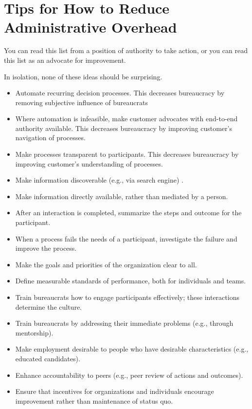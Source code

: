 \section{Tips for How to Reduce Administrative Overhead}

You can read this list from a position of authority to take action, or you can read this list as an advocate for improvement. 

In isolation, none of these ideas should be surprising.
\begin{itemize}
    \item Automate recurring decision processes. This decreases bureaucracy by removing subjective influence of bureaucrats
\item Where automation is infeasible, make customer advocates with end-to-end authority available. 
This decreases bureaucracy by improving customer's navigation of processes.
\item Make processes transparent to participants. 
This decreases bureaucracy by improving customer's understanding of processes.
\item Make information discoverable (e.g., via search engine) .
\item Make information directly available, rather than mediated by a person.
\item After an interaction is completed, summarize the steps and outcome for the participant. 
\item When a process fails the needs of a participant, investigate the failure and improve the process.
\item Make the goals and priorities of the organization clear to all.
\item Define measurable standards of performance, both for individuals and teams.
\item Train bureaucrats how to engage participants effectively; these interactions determine the culture.
\item Train bureaucrats by addressing their immediate problems (e.g., through mentorship).
\item Make employment desirable to people who have desirable characteristics (e.g., educated candidates).
\item Enhance accountability to peers (e.g., peer review of actions and outcomes).
\item Ensure that incentives for organizations and individuals encourage improvement rather than maintenance of status quo.

\end{itemize}
